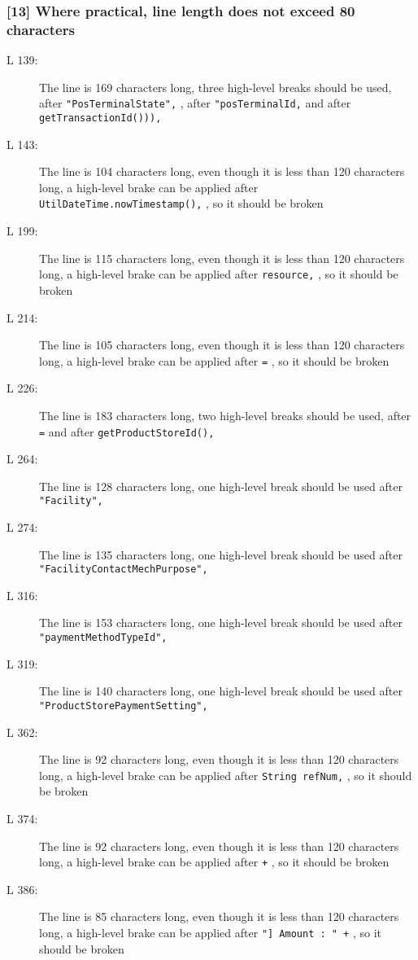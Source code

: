 \subsubsection*{[13] Where practical, line length does not exceed 80 characters}\label{subsec:lineLen}
\begin{description}
	\item[L 139:] The line is 169 characters long, three high-level breaks should be used, after {\tt "PosTerminalState",} , after {\tt "posTerminalId,} and after {\tt getTransactionId())),}
	\item[L 143:] The line is 104 characters long, even though it is less than 120 characters long, a high-level brake can be applied after {\tt UtilDateTime.nowTimestamp(),} , so it should be broken
	\item[L 199:] The line is 115 characters long, even though it is less than 120 characters long, a high-level brake can be applied after {\tt resource,} , so it should be broken
	\item[L 214:] The line is 105 characters long, even though it is less than 120 characters long, a high-level brake can be applied after {\tt =} , so it should be broken
	\item[L 226:] The line is 183 characters long, two high-level breaks should be used, after {\tt =} and after {\tt getProductStoreId(),}
	\item[L 264:] The line is 128 characters long, one high-level break should be used after {\tt "Facility",} 
	\item[L 274:] The line is 135 characters long, one high-level break should be used after {\tt "FacilityContactMechPurpose",} 
	\item[L 316:] The line is 153 characters long, one high-level break should be used after {\tt "paymentMethodTypeId",}
	\item[L 319:] The line is 140 characters long, one high-level break should be used after {\tt "ProductStorePaymentSetting",}
	\item[L 362:] The line is 92 characters long, even though it is less than 120 characters long, a high-level brake can be applied after {\tt String refNum,} , so it should be broken
	\item[L 374:] The line is 92 characters long, even though it is less than 120 characters long, a high-level brake can be applied after {\tt +} , so it should be broken
	\item[L 386:] The line is 85 characters long, even though it is less than 120 characters long, a high-level brake can be applied after {\tt "] Amount : " +} , so it should be broken

\end{description}
